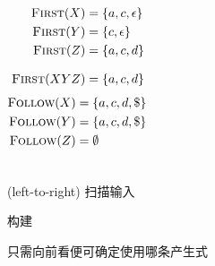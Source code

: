\begin{frame}{}
  \begin{columns}
      
      \begin{align*}
        \textsc{First}(X) &= \{a, c, \epsilon\} \\
        \textsc{First}(Y) &= \{c, \epsilon\} \\
        \textsc{First}(Z) &= \{a, c, d\} \\[8pt]
        \textsc{First}(XYZ) &= \{a, c, d\}
      \end{align*}
      \begin{align*}
        \textsc{Follow}(X) &= \{a, c, d, \$\} \\
        \textsc{Follow}(Y) &= \{a, c, d, \$\} \\
        \textsc{Follow}(Z) &= \emptyset
      \end{align*}
  \end{columns}

  
\end{frame}

\begin{frame}{}
  \begin{center}
    {\large {}}

    \vspace{0.80cm}
    \begin{description}
      \setlength{\itemsep}{12pt}
      \item[$L:$]  (left-to-right) 扫描输入
      \item[$L:$] 构建
      \item[$1:$] 只需向前看便可确定使用哪条产生式
    \end{description}
  \end{center}
\end{frame}


\begin{frame}{}
\end{frame}

\begin{frame}{}

  \begin{center}
  \end{center}
\end{frame}

